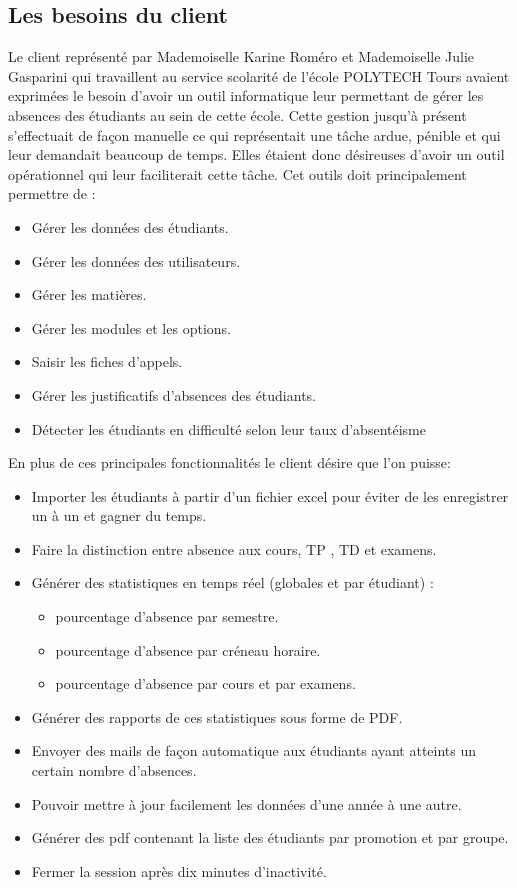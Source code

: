\documentclass[overfullbox]{polytech/polytech}
\begin{document}
\subsection{Les besoins du client}
Le client représenté par Mademoiselle Karine Roméro et Mademoiselle Julie Gasparini qui travaillent au service scolarité de l'école POLYTECH Tours avaient exprimées le besoin d'avoir un outil informatique leur permettant de gérer les absences des étudiants au sein de cette école. Cette gestion jusqu'à présent s'effectuait de façon manuelle ce qui représentait une tâche ardue, pénible et qui leur demandait beaucoup de temps. Elles étaient donc désireuses d'avoir un outil opérationnel qui leur faciliterait cette tâche. Cet outils doit principalement permettre de : 
 
\begin{itemize}
		\item Gérer les données des étudiants.
        \item Gérer les données des utilisateurs.
        \item Gérer les matières.
        \item Gérer les modules et les options.
    	\item Saisir les fiches d'appels.
        \item Gérer les justificatifs d'absences des étudiants.
        \item Détecter les étudiants en difficulté selon leur taux d’absentéisme
 \end{itemize}
En plus de ces principales fonctionnalités le client désire que l'on puisse:
\begin{itemize}
	\item Importer les étudiants à partir d'un fichier excel pour éviter de les enregistrer un à un et gagner du temps.
    \item Faire la distinction entre absence aux cours, TP , TD  et  examens.
    \item Générer des statistiques en temps réel (globales et par étudiant) :
    	\begin{itemize}
		\item pourcentage  d'absence par semestre.
		\item pourcentage d'absence par créneau horaire. 
        \item pourcentage d'absence par cours et par examens.
		\end{itemize}
    \item Générer des rapports de ces statistiques sous forme de PDF.
    \item Envoyer des mails de façon automatique aux étudiants ayant atteints un certain nombre d'absences.
    \item Pouvoir mettre à jour facilement les données d'une année à une autre.
    \item Générer des pdf contenant la liste des étudiants par promotion et par groupe.
    \item Fermer la session après dix minutes d'inactivité.
\end{itemize}
\end{document}
